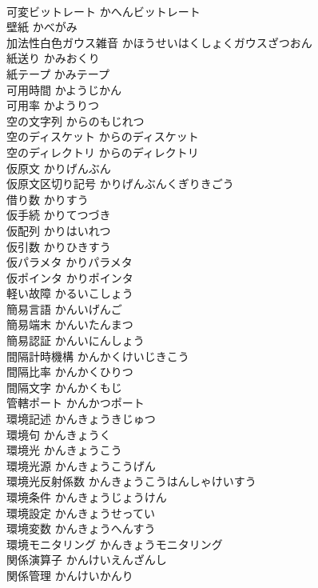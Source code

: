 \documentclass[8pt]{extreport}
\begin{document}
\begin{CJK}{UTF8}{min}
\\	可変ビットレート	かへんビットレート	
\\	壁紙	かべがみ	
\\	加法性白色ガウス雑音	かほうせいはくしょくガウスざつおん	
\\	紙送り	かみおくり	
\\	紙テープ	かみテープ	
\\	可用時間	かようじかん	
\\	可用率	かようりつ	
\\	空の文字列	からのもじれつ	
\\	空のディスケット	からのディスケット	
\\	空のディレクトリ	からのディレクトリ	
\\	仮原文	かりげんぶん	
\\	仮原文区切り記号	かりげんぶんくぎりきごう	
\\	借り数	かりすう	
\\	仮手続	かりてつづき	
\\	仮配列	かりはいれつ	
\\	仮引数	かりひきすう	
\\	仮パラメタ	かりパラメタ	
\\	仮ポインタ	かりポインタ	
\\	軽い故障	かるいこしょう	
\\	簡易言語	かんいげんご	
\\	簡易端末	かんいたんまつ	
\\	簡易認証	かんいにんしょう	
\\	間隔計時機構	かんかくけいじきこう	
\\	間隔比率	かんかくひりつ	
\\	間隔文字	かんかくもじ	
\\	管轄ポート	かんかつポート	
\\	環境記述	かんきょうきじゅつ	
\\	環境句	かんきょうく	
\\	環境光	かんきょうこう	
\\	環境光源	かんきょうこうげん	
\\	環境光反射係数	かんきょうこうはんしゃけいすう	
\\	環境条件	かんきょうじょうけん	
\\	環境設定	かんきょうせってい	
\\	環境変数	かんきょうへんすう	
\\	環境モニタリング	かんきょうモニタリング	
\\	関係演算子	かんけいえんざんし	
\\	関係管理	かんけいかんり	

\end{CJK}
\end{document}

